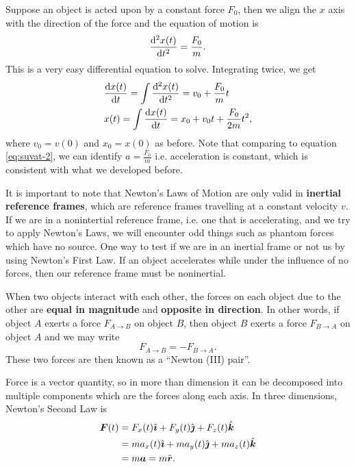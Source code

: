 \documentclass[../classical_mechanics.tex]{subfiles}
\begin{document}
        \begin{example}
            Suppose an object is acted upon by a constant force $F_0$, then we align the $x$ axis with the direction of the force and the equation of motion is
            \begin{equation}
                \dv[2]{x(t)}{t}=\frac{F_0}{m}.
            \end{equation}
            This is a very easy differential equation to solve.
            Integrating twice, we get
            \begin{align}
                &\dv{x(t)}{t}=\int\dv[2]{x(t)}{t}=v_0+\frac{F_0}{m}t\\
                &x(t)=\int\dv{x(t)}{t}=x_0+v_0t+\frac{F_0}{2m}t^2,
            \end{align}
            where $v_0=v(0)$ and $x_0=x(0)$ as before.
            Note that comparing to equation \ref{eq:suvat-2}, we can identify $a=\frac{F_0}{m}$ i.e. acceleration is constant, which is consistent with what we developed before.
        \end{example}
        It is important to note that Newton's Laws of Motion are only valid in \textbf{inertial reference frames}, which are reference frames travelling at a constant velocity $v$.
        If we are in a nonintertial reference frame, i.e. one that is accelerating, and we try to apply Newton's Laws, we will encounter odd things such as phantom forces which have no source.
        One way to test if we are in an inertial frame or not us by using Newton's First Law.
        If an object accelerates while under the influence of no forces, then our reference frame must be noninertial.
        \begin{definition}\label{def:newton-3}
            When two objects interact with each other, the forces on each object due to the other are \textbf{equal in magnitude} and \textbf{opposite in direction}.
            In other words, if object $A$ exerts a force $F_{A\to B}$ on object $B$, then object $B$ exerts a force $F_{B\to A}$ on object $A$ and we may write
            \begin{equation}
                F_{A\to B}=-F_{B\to A}.
            \end{equation}
            These two forces are then known as a ``Newton (III) pair''.
        \end{definition}

        Force is a vector quantity, so in more than dimension it can be decomposed into multiple components which are the forces along each axis.
        In three dimensions, Newton's Second Law is
        \begin{align}
            \boldsymbol{F}(t)&=F_x(t)\hat{\boldsymbol{\imath}}+F_y(t)\hat{\boldsymbol{\jmath}}+F_z(t)\hat{\boldsymbol{k}}\\
            &=ma_x(t)\hat{\boldsymbol{\imath}}+ma_y(t)\hat{\boldsymbol{\jmath}}+ma_z(t)\hat{\boldsymbol{k}} \\
            &=m\boldsymbol{a}=m\ddot{\boldsymbol{r}}.
        \end{align}
\end{document}
